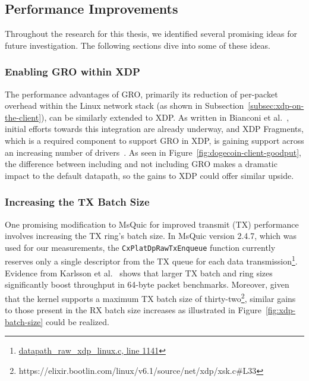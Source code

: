 \subsection{Performance Improvements}
\label{subsec:performance-improvements}
Throughout the research for this thesis, we identified several promising ideas for future investigation. The following sections dive into some of these ideas.

\subsubsection{Enabling GRO within XDP}
\label{subsubsec:enabling-gro-within-xdp}
The performance advantages of \ac{GRO}, primarily its reduction of per-packet overhead within the Linux network stack (as shown in Subsection~\ref{subsec:xdp-on-the-client}), can be similarly extended to \ac{XDP}. As written in Bianconi et al.~\cite{xdp_multibuff_2019}, initial efforts towards this integration are already underway, and \ac{XDP} Fragments, which is a required component to support \ac{GRO} in \ac{XDP}, is gaining support across an increasing number of drivers~\cite{af_xdp_driver_support}. As seen in Figure~\ref{fig:dogecoin-client-goodput}, the difference between including and not including \ac{GRO} makes a dramatic impact to the default datapath, so the gains to \ac{XDP} could offer similar upside.


\subsubsection{Increasing the TX Batch Size}
\label{subsubsec:increasing-tx-batch-size}
One promising modification to MsQuic for improved transmit (TX) performance involves increasing the TX ring's batch size. In MsQuic version 2.4.7, which was used for our measurements, the \texttt{CxPlatDpRawTxEnqueue} function currently reserves only a single descriptor from the TX queue for each data transmission\footnote{\href{https://github.com/microsoft/msquic/blob/a6fe43d7928dc550b2f24599a2769df0358f963d/src/platform/datapath\_raw\_xdp\_linux.c\#L1141}{datapath\_raw\_xdp\_linux.c, line 1141}}. Evidence from Karlsson et al.~\cite{2018AFXDPPerf} shows that larger TX batch and ring sizes significantly boost throughput in 64-byte packet benchmarks. Moreover, given that the kernel supports a maximum TX batch size of thirty-two\footnote{https://elixir.bootlin.com/linux/v6.1/source/net/xdp/xsk.c\#L33}, similar gains to those present in the RX batch size increases as illustrated in Figure~\ref{fig:xdp-batch-size} could be realized.

